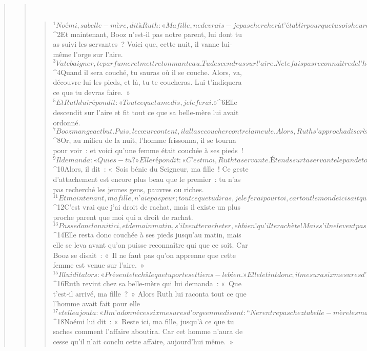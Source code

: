 \begin{verse}
\begin{verse}
         
      \bchapter{}
      \begin{verse}
${}^{1}Noémi, sa belle-mère, dit à Ruth : « Ma fille, ne devrais-je pas chercher à t’établir pour que tu sois heureuse ? 
${}^{2}Et maintenant, Booz n’est-il pas notre parent, lui dont tu as suivi les servantes ? Voici que, cette nuit, il vanne lui-même l’orge sur l’aire. 
${}^{3}Va te baigner, te parfumer et mettre ton manteau. Tu descendras sur l’aire. Ne te fais pas reconnaître de l’homme avant qu’il ait fini de manger et de boire. 
${}^{4}Quand il sera couché, tu sauras où il se couche. Alors, va, découvre-lui les pieds, et là, tu te coucheras. Lui t’indiquera ce que tu devras faire. » 
${}^{5}Et Ruth lui répondit : « Tout ce que tu me dis, je le ferai. »
${}^{6}Elle descendit sur l’aire et fit tout ce que sa belle-mère lui avait ordonné. 
${}^{7}Booz mangea et but. Puis, le cœur content, il alla se coucher contre la meule. Alors, Ruth s’approcha discrètement, découvrit les pieds de Booz et se coucha. 
${}^{8}Or, au milieu de la nuit, l’homme frissonna, il se tourna pour voir : et voici qu’une femme était couchée à ses pieds ! 
${}^{9}Il demanda : « Qui es-tu ? » Elle répondit : « C’est moi, Ruth ta servante. Étends sur ta servante le pan de ton manteau, car c’est toi qui as droit de rachat. » 
${}^{10}Alors, il dit : « Sois bénie du Seigneur, ma fille ! Ce geste d’attachement est encore plus beau que le premier : tu n’as pas recherché les jeunes gens, pauvres ou riches. 
${}^{11}Et maintenant, ma fille, n’aie pas peur ; tout ce que tu diras, je le ferai pour toi, car tout le monde ici sait que tu es une femme parfaite. 
${}^{12}C’est vrai que j’ai droit de rachat, mais il existe un plus proche parent que moi qui a droit de rachat. 
${}^{13}Passe donc la nuit ici, et demain matin, s’il veut te racheter, eh bien ! qu’il te rachète ! Mais s’il ne le veut pas, c’est moi qui te rachèterai, aussi vrai que le Seigneur est vivant ! Reste couchée jusqu’au matin ! » 
${}^{14}Elle resta donc couchée à ses pieds jusqu’au matin, mais elle se leva avant qu’on puisse reconnaître qui que ce soit. Car Booz se disait : « Il ne faut pas qu’on apprenne que cette femme est venue sur l’aire. » 
${}^{15}Il lui dit alors : « Présente le châle que tu portes et tiens-le bien. » Elle le tint donc ; il mesura six mesures d’orge et l’aida à s’en charger. Puis il rentra en ville. 
${}^{16}Ruth revint chez sa belle-mère qui lui demanda : « Que t’est-il arrivé, ma fille ? » Alors Ruth lui raconta tout ce que l’homme avait fait pour elle 
${}^{17}et elle ajouta : « Il m’a donné ces six mesures d’orge en me disant : “Ne rentre pas chez ta belle-mère les mains vides.” » 
${}^{18}Noémi lui dit : « Reste ici, ma fille, jusqu’à ce que tu saches comment l’affaire aboutira. Car cet homme n’aura de cesse qu’il n’ait conclu cette affaire, aujourd’hui même. »
      

\end{verse}
\end{verse}
\end{verse}

